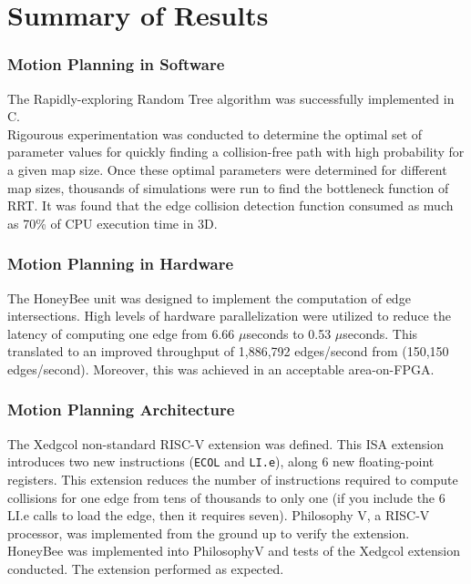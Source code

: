 

\section{Summary of Results}
    \subsubsection{Motion Planning in Software}
        The Rapidly-exploring Random Tree algorithm was successfully implemented in C. \\Rigourous experimentation was conducted to determine the optimal set of parameter values for quickly finding a collision-free path with high probability for a given map size. Once these optimal parameters were determined for different map sizes, thousands of simulations were run to find the bottleneck function of \gls{RRT}. It was found that the edge collision detection function consumed as much as 70\% of CPU execution time in \gls{3D}.

    \subsubsection{Motion Planning in Hardware}
        The HoneyBee unit was designed to implement the computation of edge intersections. High levels of hardware parallelization were utilized to reduce the latency of computing one edge from 6.66 $\mu$seconds to 0.53 $\mu$seconds. This translated to an improved throughput of 1,886,792 edges/second from (150,150 edges/second). Moreover, this was achieved in an acceptable area-on-FPGA.

    \subsubsection{Motion Planning Architecture}
        The Xedgcol non-standard RISC-V extension was defined. This ISA extension introduces two new instructions (\texttt{ECOL} and \texttt{LI.e}), along 6 new floating-point registers. This extension reduces the number of instructions required to compute collisions for one edge from tens of thousands to only one (if you include the 6 LI.e calls to load the edge, then it requires seven). Philosophy V, a RISC-V processor, was implemented from the ground up to verify the extension. HoneyBee was implemented into PhilosophyV and tests of the Xedgcol extension conducted. The extension performed as expected.

